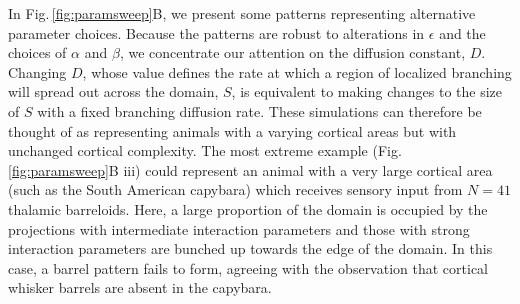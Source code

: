 \documentclass[9pt,lineno]{elife}
\newcommand{\paramsearch}[1]{\textcolor{revbblack}{#1}}
\begin{document}
\paramsearch{In Fig.\,\ref{fig:paramsweep}B, we present some patterns
  representing alternative parameter choices. Because the patterns are robust
  to alterations in $\epsilon$ and the choices of $\alpha$ and $\beta$, we
  concentrate our attention on the diffusion constant, $D$. Changing $D$,
  whose value defines the rate at which a region of localized branching will
  spread out across the domain, $S$, is equivalent to making changes to the
  size of $S$ with a fixed branching diffusion rate. These simulations can
  therefore be thought of as representing animals with a varying cortical
  areas but with unchanged cortical complexity. The most extreme example
  (Fig.\,\ref{fig:paramsweep}B iii) could represent an animal with a very
  large cortical area (such as the South American capybara) which receives
  sensory input from $N=41$ thalamic barreloids. Here, a large proportion of
  the domain is occupied by the projections with intermediate interaction
  parameters and those with strong interaction parameters are bunched up
  towards the edge of the domain. In this case, a barrel pattern fails to
  form, agreeing with the observation that cortical whisker barrels are absent
  in the capybara.}
\end{document}
